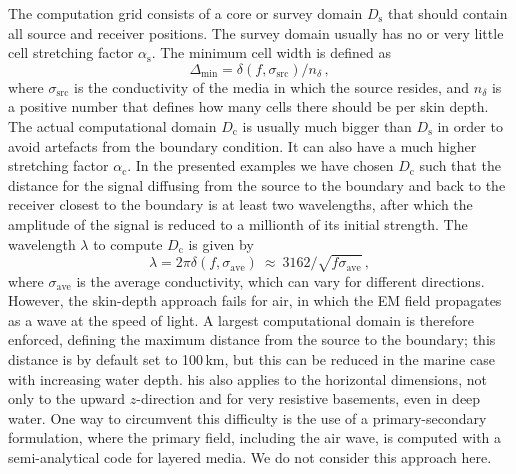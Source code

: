 \documentclass[extra, camera,%
    onecolumn,   %
    referee,     %
]{gji}
\newcommand{\mr}[1]{\mathrm{#1}}
\begin{document}
The computation grid consists of a core or survey domain $D_\mr{s}$ that should
contain all source and receiver positions. The survey domain usually has no or
very little cell stretching factor $\alpha_\mr{s}$. The minimum cell width is
defined as
%
\begin{equation}
  \Delta_\mr{min}=\delta(f, \sigma_\mr{src})/n_\delta \, ,
  \label{eq:minwidth}
\end{equation}
%
where $\sigma_\mr{src}$ is the conductivity of the media in which the source
resides, and $n_\delta$ is a positive number that defines how many cells there
should be per skin depth. The actual computational domain $D_\mr{c}$ is usually
much bigger than $D_\mr{s}$ in order to avoid artefacts from the
 boundary condition. It can also
have a much higher stretching factor $\alpha_\mr{c}$. In the presented examples
we have chosen $D_\mr{c}$ such that the distance for the signal diffusing from
the source to the boundary and back to the receiver closest to the boundary is
at least two wavelengths, after which the amplitude of the signal is reduced to
a millionth of its initial strength. The wavelength $\lambda$ to compute
$D_\mr{c}$ is given by
%
\begin{equation}
  \lambda = 2\pi\delta(f, \sigma_\mr{ave})
  \ \approx \ 3162/\sqrt{f\sigma_\mr{ave}}\, ,
 \label{eq:lambda}
\end{equation}
%
where $\sigma_\mr{ave}$ is the average conductivity, which can vary for
different directions. However, the skin-depth approach fails for air, in which
the EM field propagates as a wave at the speed of light. A largest
computational domain is therefore enforced, defining the maximum distance from
the source to the boundary; this distance is by default set to 100\,km, but
this can be reduced in the marine case with increasing water depth.
his also
applies to the horizontal dimensions, not only to the upward
$z$-direction\added{,} and  for very
resistive basements, even in deep water. One way to circumvent this difficulty
is the use of a primary-secondary formulation, where the primary field,
including the air wave, is computed with a semi-analytical code for layered
media. We do not consider this approach here. 
\end{document}
